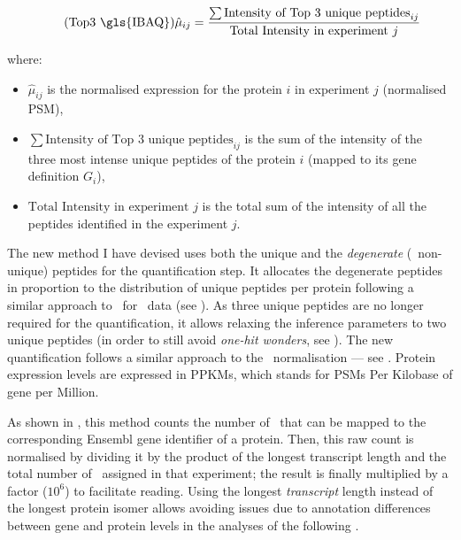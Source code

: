 \begin{minipage}{\textwidth}
\begin{equation}
    \tag{Top3 \gls{IBAQ}}\label{eq:Top3}
    \hat{\mu}_{ij}=\frac{\sum \text{Intensity of Top 3 unique peptides} _{ij}}{\text{Total Intensity in experiment } j}
    \raisetag{3\normalbaselineskip}
\end{equation}

where:{\small
\begin{itemize}[topsep=0pt,nosep]
    \item $\hat{\mu}_{ij}$ is the normalised expression for the protein $i$ in experiment $j$ (normalised \gls{PSM}),
    \item $\sum \text{Intensity of Top 3 unique peptides} _{ij}$ is
        the sum of the intensity of the three most intense unique peptides
        of the protein $i$ (mapped to its gene definition $G_i$),
    \item $\text{Total Intensity in experiment } j$ is the total sum of the intensity of all
the peptides identified in the experiment $j$.
\end{itemize}
}
\end{minipage}

The new method I have devised uses both the unique and
the \emph{degenerate} (\ie\ non-unique) peptides
for the quantification step.
It allocates the degenerate peptides
in proportion to the distribution of unique peptides per protein
following a similar approach to \cuffl\ for \Rnaseq\ data (see ).
As three unique peptides are no longer required for the quantification,
it allows relaxing the inference parameters to two unique peptides
(in order to still avoid \emph{one-hit wonders}, see ).
The new quantification follows a similar approach to the \RPKM\ normalisation ---
see .
Protein expression levels are expressed in \glspl{PPKM},
which stands for \glspl{PSM} Per Kilobase of gene per Million.\mybr\

As shown in ,
this method counts the number of \psms\
that can be mapped to the corresponding \gls{Ensembl} gene identifier of a protein.
Then, this raw count is normalised by dividing it
by the product of the longest transcript length and the total number of \psms\
assigned in that experiment;
the result is finally multiplied by a factor ($10^6$) to facilitate reading.
Using the longest \emph{transcript} length
instead of the longest protein isomer allows avoiding issues due to
annotation differences between gene and protein levels
in the analyses of the following \Cref{ch:Integration}.\mybr\

